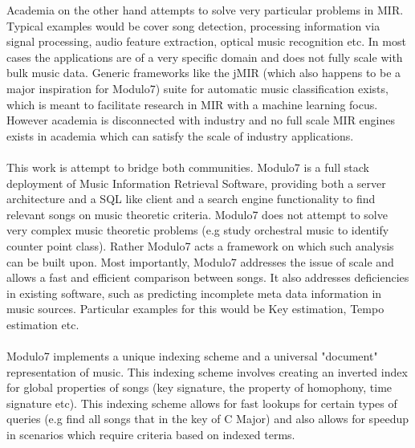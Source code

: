 Academia on the other hand attempts to solve very particular problems in MIR. Typical examples would be cover song detection\cite{coversongid}, processing information via signal processing, audio feature extraction, optical music recognition \cite{omrsurvey} etc. In most cases the applications are of a very specific domain and does not fully scale with bulk music data. Generic frameworks like the jMIR \cite{jMIR} (which also happens to be a major inspiration for Modulo7) suite for automatic music classification exists, which is meant to facilitate research in MIR with a machine learning focus. However academia is disconnected with industry and no full scale MIR engines exists in academia which can satisfy the scale of industry applications. \\\\
This work is attempt to bridge both communities. Modulo7 is a full stack deployment of Music Information Retrieval Software, providing both a server architecture and a SQL like client and a search engine functionality to find relevant songs on music theoretic criteria. Modulo7 does not attempt to solve very complex music theoretic problems (e.g study orchestral music to identify counter point class). Rather Modulo7 acts a framework on which such analysis can be built upon. Most importantly, Modulo7 addresses the issue of scale and allows a fast and efficient comparison between songs. It also addresses deficiencies in existing software, such as predicting incomplete meta data information in music sources. Particular examples for this would be Key estimation, Tempo estimation etc. \\\\
Modulo7 implements a unique indexing scheme and a universal "document" representation of music. This indexing scheme involves creating an inverted index for global properties of songs (key signature, the property of homophony, time signature etc). This indexing scheme allows for fast lookups for certain types of queries (e.g find all songs that in the key of C Major) and also allows for speedup in scenarios which require criteria based on indexed terms. 